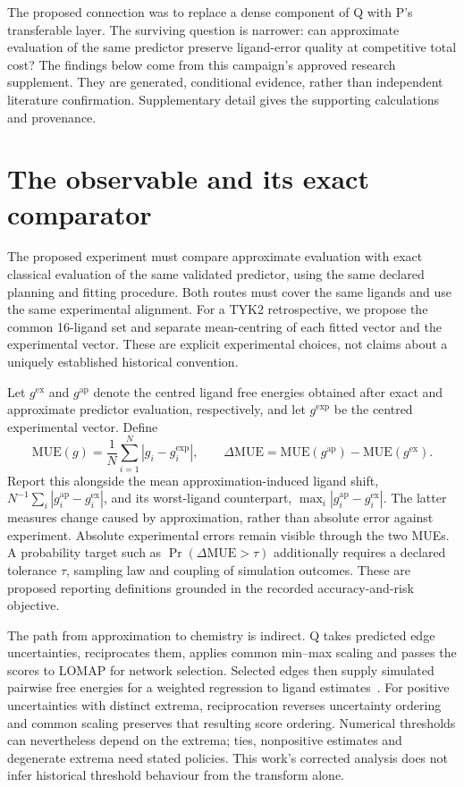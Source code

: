\documentclass{article}
\begin{document}
The proposed connection was to replace a dense component of Q with P's transferable layer. The surviving question is narrower: can approximate evaluation of the same predictor preserve ligand-error quality at competitive total cost? The findings below come from this campaign's approved research supplement. They are generated, conditional evidence, rather than independent literature confirmation. Supplementary detail gives the supporting calculations and provenance.

\section{The observable and its exact comparator}

The proposed experiment must compare approximate evaluation with exact classical evaluation of the same validated predictor, using the same declared planning and fitting procedure. Both routes must cover the same ligands and use the same experimental alignment. For a TYK2 retrospective, we propose the common 16-ligand set and separate mean-centring of each fitted vector and the experimental vector. These are explicit experimental choices, not claims about a uniquely established historical convention.

Let \(g^{\mathrm{ex}}\) and \(g^{\mathrm{ap}}\) denote the centred ligand free energies obtained after exact and approximate predictor evaluation, respectively, and let \(g^{\mathrm{exp}}\) be the centred experimental vector. Define
\[
\mathrm{MUE}(g)=\frac{1}{N}\sum_{i=1}^{N}|g_i-g_i^{\mathrm{exp}}|,
\qquad
\Delta\mathrm{MUE}=\mathrm{MUE}(g^{\mathrm{ap}})-\mathrm{MUE}(g^{\mathrm{ex}}).
\]
Report this alongside the mean approximation-induced ligand shift, \(N^{-1}\sum_i|g_i^{\mathrm{ap}}-g_i^{\mathrm{ex}}|\), and its worst-ligand counterpart, \(\max_i|g_i^{\mathrm{ap}}-g_i^{\mathrm{ex}}|\). The latter measures change caused by approximation, rather than absolute error against experiment. Absolute experimental errors remain visible through the two MUEs. A probability target such as \(\Pr(\Delta\mathrm{MUE}>\tau)\) additionally requires a declared tolerance \(\tau\), sampling law and coupling of simulation outcomes. These are proposed reporting definitions grounded in the recorded accuracy-and-risk objective.

The path from approximation to chemistry is indirect. Q takes predicted edge uncertainties, reciprocates them, applies common min--max scaling and passes the scores to LOMAP for network selection. Selected edges then supply simulated pairwise free energies for a weighted regression to ligand estimates~\cite{Q}. For positive uncertainties with distinct extrema, reciprocation reverses uncertainty ordering and common scaling preserves that resulting score ordering. Numerical thresholds can nevertheless depend on the extrema; ties, nonpositive estimates and degenerate extrema need stated policies. This work's corrected analysis does not infer historical threshold behaviour from the transform alone.
\end{document}
